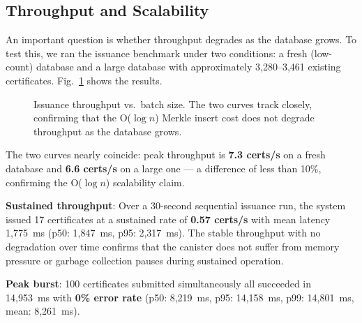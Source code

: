 \documentclass[conference]{IEEEtran}
\begin{document}
\subsection{Throughput and Scalability}

An important question is whether throughput degrades as the database grows. To test this, we ran the issuance benchmark under two conditions: a fresh (low-count) database and a large database with approximately 3,280--3,461 existing certificates. Fig.~\ref{fig:throughput} shows the results.

\begin{figure}[t]
\centering
{}
\caption{Issuance throughput vs.\ batch size. The two curves track closely, confirming that the O($\log n$) Merkle insert cost does not degrade throughput as the database grows.}
\label{fig:throughput}
\end{figure}

The two curves nearly coincide: peak throughput is \textbf{7.3 certs/s} on a fresh database and \textbf{6.6 certs/s} on a large one — a difference of less than 10\%, confirming the O($\log n$) scalability claim.

\textbf{Sustained throughput}: Over a 30-second sequential issuance run, the system issued 17 certificates at a sustained rate of \textbf{0.57 certs/s} with mean latency 1,775~ms (p50: 1,847~ms, p95: 2,317~ms). The stable throughput with no degradation over time confirms that the canister does not suffer from memory pressure or garbage collection pauses during sustained operation.

\textbf{Peak burst}: 100 certificates submitted simultaneously all succeeded in 14,953~ms with \textbf{0\% error rate} (p50: 8,219~ms, p95: 14,158~ms, p99: 14,801~ms, mean: 8,261~ms).
\end{document}
